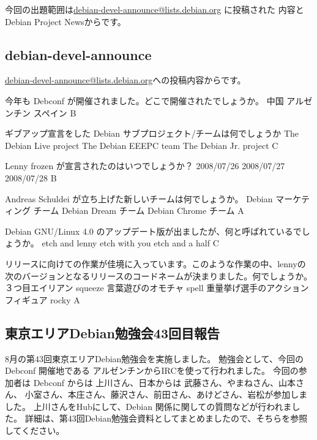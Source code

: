 \documentclass[mingoth,a4paper]{jsarticle}
\begin{document}
今回の出題範囲は\url{debian-devel-announce@lists.debian.org} に投稿された
内容とDebian Project Newsからです。
\begin{multicols}{2}
 \subsection{debian-devel-announce}
 \url{debian-devel-announce@lists.debian.org}への投稿内容からです。
 
 \santaku
 {今年も Debconf が開催されました。どこで開催されたでしょうか。}
 {中国}
 {アルゼンチン}
 {スペイン}
 {B}
 
 \santaku
 {ギブアップ宣言をした Debian サブプロジェクト/チームは何でしょうか}
 {The Debian Live project}
 {The Debian EEEPC team}
 {The Debian Jr. project}
 {C}

 \santaku
 {Lenny frozen が宣言されたのはいつでしょうか？}
 {2008/07/26}
 {2008/07/27}
 {2008/07/28}
 {B}
 
 \santaku
 {Andreas Schuldei が立ち上げた新しいチームは何でしょうか。}
 {Debian マーケティング チーム}
 {Debian Dream チーム}
 {Debian Chrome チーム}
 {A}

 \santaku
 {Debian GNU/Linux 4.0 のアップデート版が出ましたが、何と呼ばれているでしょうか。}
 {etch and lenny}
 {etch with you}
 {etch and a half}
 {C}

 \santaku
 {リリースに向けての作業が佳境に入っています。このような作業の中、lennyの次のバージョンとなるリリースのコードネームが決まりました。何でしょうか。}
 {３つ目エイリアン squeeze}%
 {言葉遊びのオモチャ spell}%
 {重量挙げ選手のアクションフィギュア rocky}%
 {A}

\end{multicols}
\subsection{東京エリアDebian勉強会43回目報告}
8月の第43回東京エリアDebian勉強会を実施しました。 
勉強会として、今回の Debconf 開催地である アルゼンチンからIRCを使って行われました。
今回の参加者は Debconf からは 上川さん、日本からは 武藤さん、やまねさん、山本さん、
小室さん、本庄さん、藤沢さん、前田さん、あけどさん、岩松が参加しました。
上川さんをHubにして、Debian 関係に関しての質問などが行われました。
詳細は、第43回Debian勉強会資料としてまとめましたので、そちらを参照してください。
\end{document}
